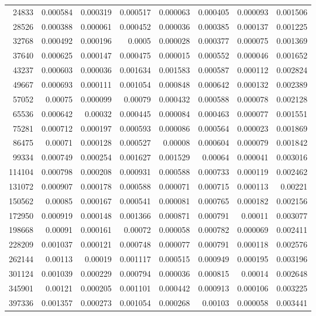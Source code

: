 \begin{tabular}{r r r r r r r r}
24833 & 0.000584 & 0.000319 & 0.000517 & 0.000063 & 0.000405 & 0.000093 & 0.001506 \\
28526 & 0.000388 & 0.000061 & 0.000452 & 0.000036 & 0.000385 & 0.000137 & 0.001225 \\
32768 & 0.000492 & 0.000196 & 0.0005 & 0.000028 & 0.000377 & 0.000075 & 0.001369 \\
37640 & 0.000625 & 0.000147 & 0.000475 & 0.000015 & 0.000552 & 0.000046 & 0.001652 \\
43237 & 0.000603 & 0.000036 & 0.001634 & 0.001583 & 0.000587 & 0.000112 & 0.002824 \\
49667 & 0.000693 & 0.000111 & 0.001054 & 0.000848 & 0.000642 & 0.000132 & 0.002389 \\
57052 & 0.00075 & 0.000099 & 0.00079 & 0.000432 & 0.000588 & 0.000078 & 0.002128 \\
65536 & 0.000642 & 0.00032 & 0.000445 & 0.000084 & 0.000463 & 0.000077 & 0.001551 \\
75281 & 0.000712 & 0.000197 & 0.000593 & 0.000086 & 0.000564 & 0.000023 & 0.001869 \\
86475 & 0.00071 & 0.000128 & 0.000527 & 0.00008 & 0.000604 & 0.000079 & 0.001842 \\
99334 & 0.000749 & 0.000254 & 0.001627 & 0.001529 & 0.00064 & 0.000041 & 0.003016 \\
114104 & 0.000798 & 0.000208 & 0.000931 & 0.000588 & 0.000733 & 0.000119 & 0.002462 \\
131072 & 0.000907 & 0.000178 & 0.000588 & 0.000071 & 0.000715 & 0.000113 & 0.00221 \\
150562 & 0.00085 & 0.000167 & 0.000541 & 0.000081 & 0.000765 & 0.000182 & 0.002156 \\
172950 & 0.000919 & 0.000148 & 0.001366 & 0.000871 & 0.000791 & 0.00011 & 0.003077 \\
198668 & 0.00091 & 0.000161 & 0.00072 & 0.000058 & 0.000782 & 0.000069 & 0.002411 \\
228209 & 0.001037 & 0.000121 & 0.000748 & 0.000077 & 0.000791 & 0.000118 & 0.002576 \\
262144 & 0.00113 & 0.00019 & 0.001117 & 0.000515 & 0.000949 & 0.000195 & 0.003196 \\
301124 & 0.001039 & 0.000229 & 0.000794 & 0.000036 & 0.000815 & 0.00014 & 0.002648 \\
345901 & 0.00121 & 0.000205 & 0.001101 & 0.000442 & 0.000913 & 0.000106 & 0.003225 \\
397336 & 0.001357 & 0.000273 & 0.001054 & 0.000268 & 0.00103 & 0.000058 & 0.003441 \\

\end{tabular}
